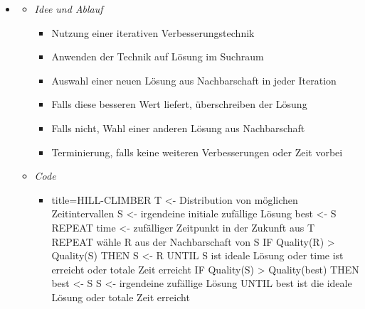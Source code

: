 \documentclass[
    12pt,
    a4paper,
    ngerman,
    color=3b,%
    marginpar=false,
    colorback=false,
    leqno,
]{tudaexercise}
\begin{document}
\begin{itemize}
\begin{itemize}
\begin{itemize}
                    \end{itemize}
            \end{itemize}
\clearpage
        \item {}
            \begin{itemize}
                \item \textit{Idee und Ablauf}
                    \begin{itemize}
                        \item Nutzung einer iterativen Verbesserungstechnik
                        \item Anwenden der Technik auf  Lösung im Suchraum
                        \item Auswahl einer neuen Lösung aus Nachbarschaft in jeder Iteration
                        \item Falls diese besseren Wert liefert, überschreiben der  Lösung
                        \item Falls nicht, Wahl einer anderen Lösung aus Nachbarschaft
                        \item Terminierung, falls keine weiteren Verbesserungen oder Zeit vorbei
                    \end{itemize}
                \item \textit{Code}
                    \begin{itemize}
                        \item[]
                            \begin{ccode}[autogobble,fontsize=\small]{title={HILL-CLIMBER}}
                            T <- Distribution von möglichen Zeitintervallen
                            S <- irgendeine initiale zufällige Lösung
                            best <- S
                            REPEAT
                                time <- zufälliger Zeitpunkt in der Zukunft aus T
                                REPEAT
                                    wähle R aus der Nachbarschaft von S
                                    IF Quality(R) > Quality(S) THEN
                                        S <- R
                                UNTIL S ist ideale Lösung oder time ist erreicht oder totale Zeit erreicht
                                IF Quality(S) > Quality(best) THEN
                                    best <- S
                                S <- irgendeine zufällige Lösung
                            UNTIL best ist die ideale Lösung oder totale Zeit erreicht

\end{ccode}
\end{itemize}
\end{itemize}
\end{itemize}
\end{document}
